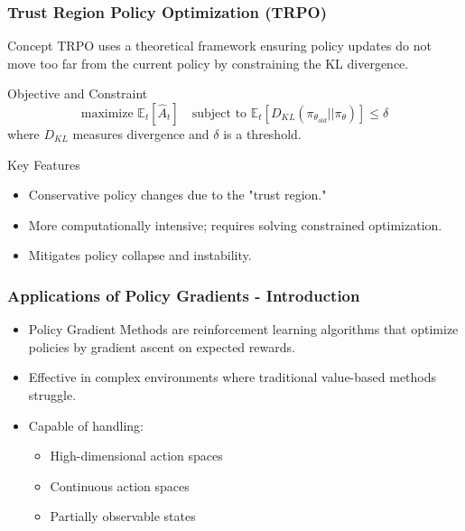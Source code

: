 \documentclass[aspectratio=169]{beamer}
\begin{document}
\begin{frame}[fragile]
    \frametitle{Trust Region Policy Optimization (TRPO)}
    \begin{block}{Concept}
        TRPO uses a theoretical framework ensuring policy updates do not move too far from the current policy by constraining the KL divergence.
    \end{block}

    \begin{block}{Objective and Constraint}
        \begin{equation}
            \text{maximize } \mathbb{E}_t \left[ \hat{A}_t \right] \quad \text{subject to } \mathbb{E}_t \left[ D_{KL}\left( \pi_{\theta_{old}} || \pi_\theta \right) \right] \leq \delta
        \end{equation}
        where \( D_{KL} \) measures divergence and \( \delta \) is a threshold.
    \end{block}

    \begin{block}{Key Features}
        \begin{itemize}
            \item Conservative policy changes due to the "trust region."
            \item More computationally intensive; requires solving constrained optimization.
            \item Mitigates policy collapse and instability.
        \end{itemize}
    \end{block}
\end{frame}

\begin{frame}[fragile]
    \frametitle{Applications of Policy Gradients - Introduction}
    \begin{itemize}
        \item Policy Gradient Methods are reinforcement learning algorithms that optimize policies by gradient ascent on expected rewards.
        \item Effective in complex environments where traditional value-based methods struggle.
        \item Capable of handling:
        \begin{itemize}
            \item High-dimensional action spaces
            \item Continuous action spaces
            \item Partially observable states
        \end{itemize}
    \end{itemize}
\end{frame}
\end{document}
